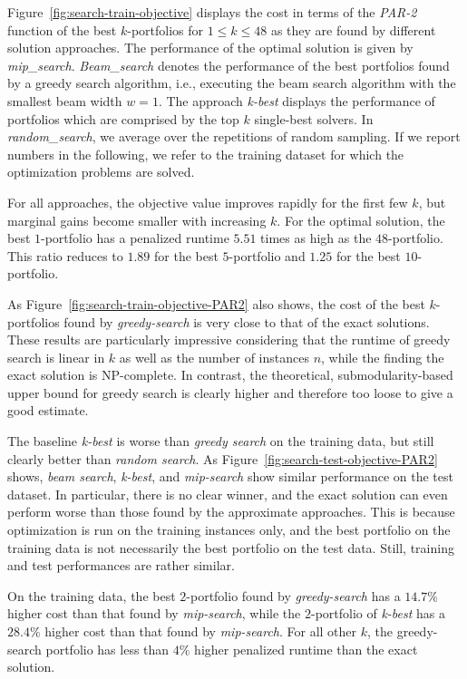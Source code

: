 \documentclass[conference]{IEEEtran}
\begin{document}
Figure~\ref{fig:search-train-objective} displays the cost in terms of the \emph{PAR-2} function of the best $k$-portfolios for $1 \leq k \leq 48$ as they are found by different solution approaches. 
The performance of the optimal solution is given by \emph{mip\_search}. 
\emph{Beam\_search} denotes the performance of the best portfolios found by a greedy search algorithm, i.e., executing the beam search algorithm with the smallest beam width $w=1$. 
The approach \emph{k-best} displays the performance of portfolios which are comprised by the top $k$ single-best solvers. 
In \emph{random\_search}, we average over the repetitions of random sampling.
If we report numbers in the following, we refer to the training dataset for which the optimization problems are solved.

For all approaches, the objective value improves rapidly for the first few $k$, but marginal gains become smaller with increasing $k$.
For the optimal solution, the best $1$-portfolio has a penalized runtime $5.51$ times as high as the $48$-portfolio. 
This ratio reduces to $1.89$ for the best $5$-portfolio and $1.25$ for the best $10$-portfolio. 

As Figure~\ref{fig:search-train-objective-PAR2} also shows, the cost of the best $k$-portfolios found by \emph{greedy-search} is very close to that of the exact solutions.
These results are particularly impressive considering that the runtime of greedy search is linear in $k$ as well as the number of instances $n$, while the finding the exact solution is NP-complete.
In contrast, the theoretical, submodularity-based upper bound for greedy search is clearly higher and therefore too loose to give a good estimate. 

The baseline \emph{k-best} is worse than \emph{greedy search} on the training data, but still clearly better than \emph{random search}.
As Figure~\ref{fig:search-test-objective-PAR2} shows, \emph{beam search}, \emph{k-best}, and \emph{mip-search} show similar performance on the test dataset.
In particular, there is no clear winner, and the exact solution can even perform worse than those found by the approximate approaches. 
This is because optimization is run on the training instances only, and the best portfolio on the training data is not necessarily the best portfolio on the test data.
Still, training and test performances are rather similar.

On the training data, the best $2$-portfolio found by \emph{greedy-search} has a $14.7\%$ higher cost than that found by \emph{mip-search}, while the $2$-portfolio of \emph{k-best} has a $28.4\%$ higher cost than that found by \emph{mip-search}. 
For all other $k$, the greedy-search portfolio has less than $4\%$ higher penalized runtime than the exact solution. 
\end{document}
